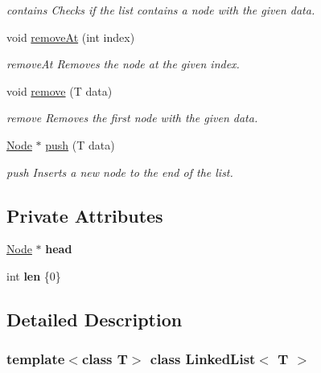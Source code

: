 \begin{DoxyCompactItemize}
\begin{DoxyCompactList}\small\item\em contains Checks if the list contains a node with the given data. \end{DoxyCompactList}\item 
void \hyperlink{classLinkedList_a970cd1e84d2b83af40612dd0e75ebd7a}{remove\+At} (int index)
\begin{DoxyCompactList}\small\item\em remove\+At Removes the node at the given index. \end{DoxyCompactList}\item 
void \hyperlink{classLinkedList_ab9aa6e03f271785f6b488d8c4cc3f3c7}{remove} (T data)
\begin{DoxyCompactList}\small\item\em remove Removes the first node with the given data. \end{DoxyCompactList}\item 
\hyperlink{structLinkedList_1_1Node}{Node} $\ast$ \hyperlink{classLinkedList_a3a1e6c2009b611fb4416574178b316a3}{push} (T data)
\begin{DoxyCompactList}\small\item\em push Inserts a new node to the end of the list. \end{DoxyCompactList}\end{DoxyCompactItemize}
\subsection*{Private Attributes}
\begin{DoxyCompactItemize}
\item 
\mbox{\label{classLinkedList_a2d1f848e19caa3f180b7fa6938125bba}} 
\hyperlink{structLinkedList_1_1Node}{Node} $\ast$ {\bfseries head}
\item 
\mbox{\label{classLinkedList_a06b9d1f7914d2c6ca3f46653176b713c}} 
int {\bfseries len} \{0\}
\end{DoxyCompactItemize}


\subsection{Detailed Description}
\subsubsection*{template$<$class T$>$\newline
class Linked\+List$<$ T $>$}

